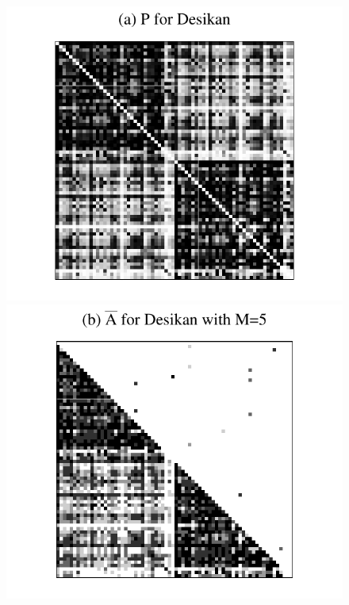 \documentclass[journal,twoside,web]{ieeecolor}
\begin{document}
\begin{figure}[!tbp]
\centering
\includegraphics[height=.11\textheight]{P_desikan_m5.pdf} \hspace{-24pt}
\includegraphics[height=.11005\textheight]{Abar_desikan_m5.pdf} \hspace{-24pt}

\end{figure}
\end{document}
